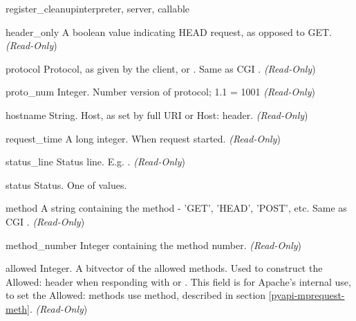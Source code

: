 \begin{funcdesc}{register_cleanup}{interpreter, server, callable}
\begin{memberdesc}[request]{header_only}
  A boolean value indicating HEAD request, as opposed to GET. 
  \emph{(Read-Only})
\end{memberdesc}

\begin{memberdesc}[request]{protocol}
  Protocol, as given by the client, or . Same as CGI .
  \emph{(Read-Only})
\end{memberdesc}

\begin{memberdesc}[request]{proto_num}
  Integer. Number version of protocol; 1.1 = 1001 
  \emph{(Read-Only})
\end{memberdesc}

\begin{memberdesc}[request]{hostname}
  String. Host, as set by full URI or Host: header.
  \emph{(Read-Only})
\end{memberdesc}

\begin{memberdesc}[request]{request_time}
  A long integer. When request started.
  \emph{(Read-Only})
\end{memberdesc}

\begin{memberdesc}[request]{status_line}
  Status line. E.g. . 
  \emph{(Read-Only})
\end{memberdesc}

\begin{memberdesc}[request]{status}
  Status. One of  values.
\end{memberdesc}

\begin{memberdesc}[request]{method}
  A string containing the method - 'GET', 'HEAD', 'POST', etc.
  Same as CGI .
  \emph{(Read-Only})
\end{memberdesc}

\begin{memberdesc}[request]{method_number}
  Integer containing the method number.
  \emph{(Read-Only})
\end{memberdesc}

\begin{memberdesc}[request]{allowed}
  Integer. A bitvector of the allowed methods. Used to construct the
  Allowed: header when responding with
   or
  . This field is for Apache's internal
  use, to set the Allowed: methods use 
  method, described in section \ref{pyapi-mprequest-meth}. 
  \emph{(Read-Only})
\end{memberdesc}


\end{funcdesc}
